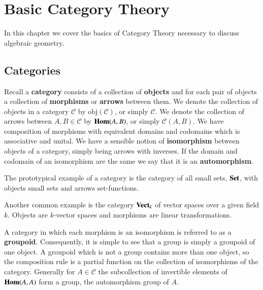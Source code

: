 %
%
%
\chapter{Basic Category Theory}
\label{Cat} %

In this chapter we cover the basics of Category Theory necessary to discuss algebraic geometry.

\section{Categories}

Recall a \textbf{category} consists of a collection of \textbf{objects} and for each pair of objects a collection of \textbf{morphisms} or \textbf{arrows} between them. We denote the collection of objects in a category $\mathscr{C}$ by $\text{obj}(\mathscr{C})$, or simply $\mathscr{C}$. We denote the collection of arrows between $A,B \in \mathscr{C}$ by $\mathbf{Hom}(A,B)$, or simply $\mathscr{C}(A,B)$. We have composition of morphisms with equivalent domains and codomains which is associative and unital. We have a sensible notion of \textbf{isomorphism} between objects of a category, simply being arrows with inverses. If the domain and codomain of an isomorphism are the same we say that it is an \textbf{automorphism}. 

\begin{example}
    The prototypical example of a category is the category of all small sets, $\normalfont\textbf{Set}$, with objects small sets and arrows set-functions.
\end{example}

\begin{example}
    Another common example is the category $\normalfont\textbf{Vect}_{k}$ of vector spaces over a given field $k$. Objects are $k$-vector spaces and morphisms are linear transformations.
\end{example}

A category in which each morphism is an isomorphism is referred to as a \textbf{groupoid}. Consequently, it is simple to see that a group is simply a groupoid of one object. A groupoid which is not a group contains more than one object, so the composition rule is a partial function on the collection of isomorphisms of the category. Generally for $A \in \mathscr{C}$ the subcollection of invertible elements of $\mathbf{Hom}(A,A)$ form a group, the automorphism group of $A$. 

